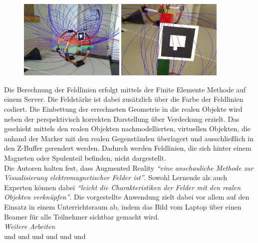 \begin{figure}[h!]
	\centering
	\includegraphics[width=0.45\textwidth]{images/Buchau09.jpg}
	\hspace{0.05cm}
	\includegraphics[width=0.45\textwidth]{images/Buchau09_Magnet_2.jpg}
	\caption{\cite{Matsutomo13}}
\end{figure}

Die Berechnung der Feldlinien erfolgt mittels der Finite Elemente Methode auf einem Server. Die Feldstärke ist dabei zusätzlich über die Farbe der Feldlinien codiert. Die Einbettung der errechneten Geometrie in die realen Objekte wird neben der perspektivisch korrekten Darstellung über Verdeckung erzielt. Das geschieht mittels den realen Objekten nachmodellierten, virtuellen Objekten, die anhand der Marker mit den realen Gegenständen überlagert und ausschließlich in den Z-Buffer gerendert werden. Dadurch werden Feldlinien, die sich hinter einem Magneten oder Spulenteil befinden, nicht dargestellt.\\

Die Autoren halten fest, dass Augmented Reality \textit{``eine anschauliche Methode zur Visualisierung elektromagnetischer Felder ist''}. Sowohl Lernende als auch Experten können dabei \textit{``leicht die Charakteristiken der Felder mit den realen Objekten verknüpfen''}. Die vorgestellte Anwendung zielt dabei vor allem auf den Einsatz in einem Unterrichtsraum ab, indem das Bild vom Laptop über einen Beamer für alle Teilnehmer sichtbar gemacht wird.\\

\vspace{4px}
\textit{Weitere Arbeiten}\\
\cite{Amiraslanov18} und \cite{Javaheri18} und \cite{Matsutomo13} und \cite{Mannuss11} und \cite{Jerry10} und \cite{Kaufmann08} und \cite{Techakosit15}

